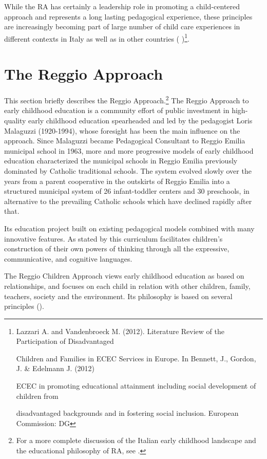 \documentclass[12pt]{article}
\begin{document}
While the RA has certainly a leadership role in promoting a child-centered
approach and represents a long lasting pedagogical experience, these
principles are increasingly becoming part of large number of child care
experiences in different contexts in Italy as well as in other countries (%
\cite{Lazzari2012})\footnote{%
Lazzari A. and Vandenbroeck M. (2012). Literature Review of the
Participation of Disadvantaged
\par
Children and Families in ECEC Services in Europe. In Bennett, J., Gordon, J.
\& Edelmann J. (2012)
\par
ECEC in promoting educational attainment including social development of
children from
\par
disadvantaged backgrounds and in fostering social inclusion. European
Commission: DG}.

\section{The Reggio Approach}

\label{sec:RA} %
This section briefly describes the Reggio Approach.\footnote{%
For a more complete discussion of the Italian early childhood landscape and
the educational philosophy of RA, see \citet{biroli2015evaluating}.} The
Reggio Approach to early childhood education is a community effort of public
investment in high-quality early childhood education spearheaded and led by
the pedagogist Loris Malaguzzi (1920-1994), whose foresight has been the
main influence on the approach. Since Malaguzzi became Pedagogical
Consultant to Reggio Emilia municipal school in 1963, more and more
progressive models of early childhood education characterized the municipal
schools in Reggio Emilia previously dominated by Catholic traditional
schools. The system evolved slowly over the years from a parent cooperative
in the outskirts of Reggio Emilia into a structured municipal system of 26
infant-toddler centers and 30 preschools, in alternative to the prevailing
Catholic schools which have declined rapidly after that.

Its education project built on existing pedagogical models combined with
many innovative features. As stated by \cite{Edwards1993} this curriculum
facilitates children's construction of their own powers of thinking through
all the expressive, communicative, and cognitive languages.

The Reggio Children Approach views early childhood education as based on
relationships, and focuses on each child in relation with other children,
family, teachers, society and the environment. Its philosophy is based on
several principles (\cite{Rinaldi2005,Gandini1993}).
\end{document}
